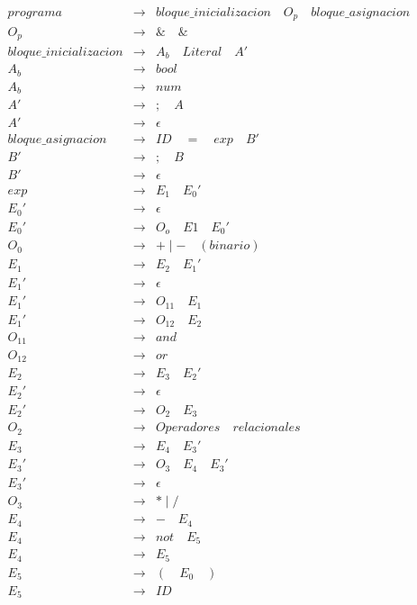 \documentclass{article}
\begin{document}
$
\begin{array}{lcl}
programa & \rightarrow & bloque\_inicializacion\quad O_p\quad bloque\_asignacion \\
O_p & \rightarrow & \&\quad \& \\
bloque\_inicializacion & \rightarrow & A_b\quad Literal\quad A' \\
A_b & \rightarrow & bool \\
A_b & \rightarrow & num \\
A' & \rightarrow & ;\quad  A\\
A' & \rightarrow & \epsilon\\
bloque\_asignacion & \rightarrow & ID\quad =\quad exp\quad B' \\
B' & \rightarrow & ;\quad  B\\
B' & \rightarrow & \epsilon\\
exp & \rightarrow & E_1\quad E_0'  \\
E_0' & \rightarrow & \epsilon \\
E_0' & \rightarrow & O_o\quad E1\quad E_0' \\
O_0 & \rightarrow & + \mid -\quad (binario) \\
E_1 & \rightarrow & E_2\quad E_1' \\
E_1' & \rightarrow & \epsilon \\
E_1' & \rightarrow & O_{11}\quad E_{1}\\
E_1' & \rightarrow & O_{12}\quad E_{2}\\
O_{11} & \rightarrow & and \\
O_{12} & \rightarrow & or \\
E_2 & \rightarrow & E_3\quad E_2'\\
E_2' & \rightarrow & \epsilon \\
E_2' & \rightarrow & O_2\quad E_3 \\
O_2 & \rightarrow & Operadores\quad relacionales \\
E_3 & \rightarrow & E_4\quad E_3' \\
E_3' & \rightarrow & O_3\quad E_4\quad E_3'\\
E_3' & \rightarrow & \epsilon \\
O_3 & \rightarrow & * \mid / \\
E_4 & \rightarrow & - \quad E_4 \\
E_4 & \rightarrow & not \quad E_5 \\
E_4 & \rightarrow & E_5 \\
E_5 & \rightarrow & (\quad E_0 \quad) \\
E_5 & \rightarrow & ID \\
\end{array}
$
\end{document}
